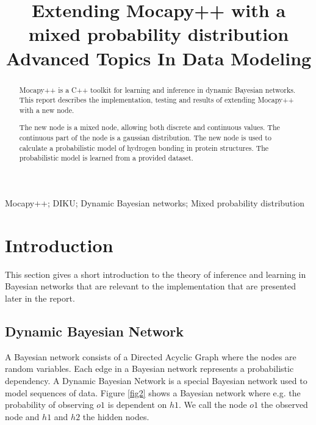 \documentclass[10pt, journal, compsoc, a4paper]{IEEEtran}
\begin{document}
\title{Extending Mocapy++ with a mixed probability distribution\\Advanced Topics In Data Modeling}

\author{
}

\maketitle

\begin{abstract}
Mocapy++ is a C++ toolkit for learning and inference in dynamic Bayesian networks. This report describes the implementation, testing and results of extending Mocapy++ with a new node. 

The new node is a mixed node, allowing both discrete and continuous values. The continuous part of the node is a gaussian distribution. The new node is used to calculate a probabilistic model of hydrogen bonding in protein structures. The probabilistic model is learned from a provided dataset.
\end{abstract}

\begin{IEEEkeywords}
Mocapy++; DIKU; Dynamic Bayesian networks; Mixed probability distribution
\end{IEEEkeywords}


\section{Introduction} %
\label{sec:introduction}

This section gives a short introduction to the theory of inference and learning in Bayesian networks that are relevant to the implementation that are presented later in the report.

\subsection{Dynamic Bayesian Network} %
\label{sub:dynamic_bayesian_network}
A Bayesian network consists of a Directed Acyclic Graph where the nodes are random variables. Each edge in a Bayesian network represents a probabilistic dependency. A Dynamic Bayesian Network is a special Bayesian network used to model sequences of data. Figure \ref{fig2} shows a Bayesian network where e.g. the probability of observing $o1$ is dependent on $h1$. We call the node $o1$ the observed node and $h1$ and $h2$ the hidden nodes. 
\end{document}
